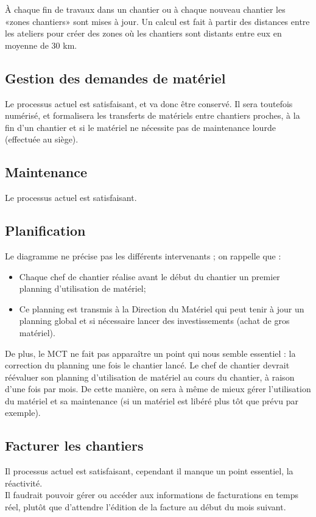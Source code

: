 \documentclass[a4paper]{article}
\begin{document}
À chaque fin de travaux dans un chantier ou à chaque nouveau chantier les
«zones chantiers» sont mises à jour. Un calcul est fait à partir des
distances entre les ateliers pour créer des zones où les chantiers sont
distants entre eux en moyenne de 30 km.


\subsection{Gestion des demandes de matériel}


Le processus actuel est satisfaisant, et va donc être conservé. Il sera
toutefois numérisé, et formalisera les transferts de matériels entre
chantiers proches, à la fin d'un chantier et si le matériel ne nécessite
pas de maintenance lourde (effectuée au siège).


\subsection{Maintenance}

Le processus actuel est satisfaisant.

\subsection{Planification}

Le diagramme ne précise pas les différents intervenants ; on rappelle que :
\begin{itemize}
\item Chaque chef de chantier réalise avant le début du chantier un premier
planning d'utilisation de matériel;
\item Ce planning est transmis à la Direction du Matériel qui peut tenir à
jour un planning global et si nécessaire lancer des investissements (achat
de gros matériel).
\end{itemize}

\vskip 6pt

De plus, le MCT ne fait pas apparaître un point qui nous semble essentiel :
la correction du planning une fois le chantier lancé. Le chef de chantier
devrait réévaluer son planning d'utilisation de matériel au cours du
chantier, à raison d'une fois par mois. De cette manière, on sera à même de
mieux gérer l'utilisation du matériel et sa maintenance (si un matériel est
libéré plus tôt que prévu par exemple).


\subsection{Facturer les chantiers}

Il processus actuel est satisfaisant, cependant il manque un point essentiel,
la réactivité. \\
Il faudrait pouvoir gérer ou accéder aux informations de facturations en 
temps réel, plutôt que d’attendre l'édition de la facture au début du 
mois suivant.
\end{document}
